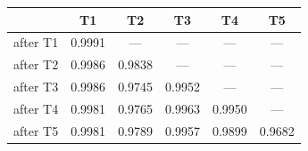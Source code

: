 \begin{tabular}{@{}lccccc@{}}
\toprule
& \textbf{T1} & \textbf{T2} & \textbf{T3} & \textbf{T4} & \textbf{T5} \\
\midrule
after T1 & 0.9991 & --- & --- & --- & --- \\
after T2 & 0.9986 & 0.9838 & --- & --- & --- \\
after T3 & 0.9986 & 0.9745 & 0.9952 & --- & --- \\
after T4 & 0.9981 & 0.9765 & 0.9963 & 0.9950 & --- \\
after T5 & 0.9981 & 0.9789 & 0.9957 & 0.9899 & 0.9682 \\
\bottomrule
\end{tabular}
